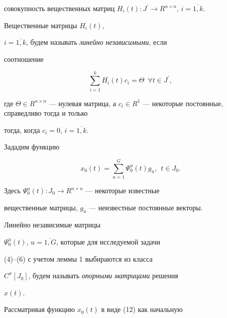 совокупность вещественных матриц $H_i(t): J^\prime \to


R^{n\times n}$, $i=\overline{1,k}$.





\begin{defn}


Вещественные матрицы $H_i(t)$,


$i=\overline{1,k}$, будем называть {\em линейно независимыми}, если


соотношение


$$


\sum_{i=1}^{k}H_i(t)c_i=\Theta\ \; \forall t\in J^\prime ,


$$


где $\Theta \in R^{n\times n}$ --- нулевая матрица, а $c_i


\in R^1$ --- некоторые постоянные, справедливо тогда и только


тогда, когда $c_i=0$, $i=\overline{1,k}$.


\end{defn}





Зададим функцию 


\begin{equation}


x_0(t)=\sum_{u=1}^{G}\Psi_0^u(t)g_u,\ \ t\in J_0.


\end{equation}


Здесь $\Psi_0^u(t): J_0 \to R^{n\times n}$ --- некоторые известные


вещественные матрицы, $g_u$ --- неизвестные постоянные векторы.





\begin{defn}


Линейно независимые матрицы


$\Psi_0^u(t)$, $u=\overline{1,G}$, которые для исследуемой задачи


(4)--(6) с учетом леммы 1 выбираются из класса


$C^{\sigma}[J_0]$, будем называть {\em опорными матрицами} решения


$x(t)$.


\end{defn}





Рассматривая функцию $x_0(t)$ в виде (12) как начальную


